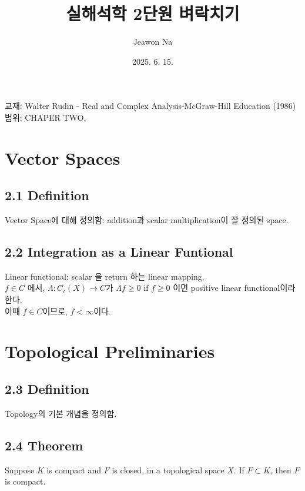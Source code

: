 \documentclass[11pt,reqno]{amsart}
\renewcommand{\(}{\left(}
\renewcommand{\)}{\right)}
\renewcommand{\[}{\left[}
\renewcommand{\]}{\right]}
\begin{document}
\title[]{실해석학 2단원 벼락치기}
\author{Jeawon Na}
\date{2025. 6. 15.}

\maketitle

\vspace{0.5em}

교재: Walter Rudin - Real and Complex Analysis-McGraw-Hill Education (1986) \\
범위: CHAPER TWO,

\section{Vector Spaces}

\subsection{2.1 Definition}

Vector Space에 대해 정의함: addition과 scalar multiplication이 잘 정의된 space.

\subsection{2.2 Integration as a Linear Funtional}

Linear functional: scalar 을 return 하는 linear mapping. \\
$f \in C$ 에서, $\Lambda : C_c (X) \to C$가 $\Lambda f \ge 0$ if $f \ge 0$ 이면 positive linear functional이라 한다. \\
이때 $f \in C$이므로, $f < \infty$이다.

\section{Topological Preliminaries}

\subsection{2.3 Definition}

Topology의 기본 개념을 정의함.

\subsection{2.4 Theorem}

Suppose $K$ is compact and $F$ is closed, in a topological space $X$. If $F \subset K$, then $F$ is compact.
\end{document}
